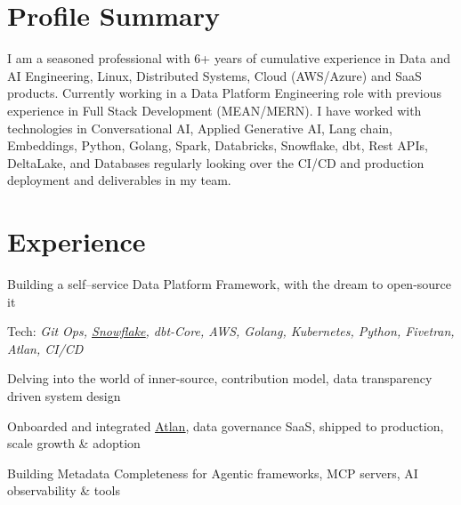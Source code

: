 \documentclass[]{deedy-resume-reversed}
\begin{document}
%
%
\lastupdated

%
%


\section{Profile Summary}
\justifying
I am a seasoned professional with 6+ years of cumulative experience in Data and AI Engineering, Linux, Distributed Systems, Cloud (AWS/Azure) and SaaS products. Currently working in a Data Platform Engineering role with previous experience in Full Stack Development (MEAN/MERN). I have worked with technologies in Conversational AI, Applied Generative AI, Lang chain, Embeddings, Python, Golang, Spark, Databricks, Snowflake, dbt, Rest APIs, DeltaLake, and Databases regularly looking over the CI/CD and production deployment and deliverables in my team.


\section{Experience}
\vspace{\topsep} %
\begin{tightemize}
\item Building a self–service Data Platform Framework, with the dream to open-source it
\item Tech: \textit{Git Ops, \href{https://www.snowflake.com/en/}{\underline{Snowflake}}, dbt-Core, AWS, Golang, Kubernetes, Python, Fivetran, Atlan, CI/CD}
\item Delving into the world of inner-source, contribution model, data transparency driven system design
\item Onboarded and integrated \href{https://atlan.com/demo/?ref=%2F&tour=data-discovery}{{\underline{Atlan}}}, data governance SaaS, shipped to production, scale growth \& adoption
\item Building Metadata Completeness for Agentic frameworks, MCP servers, AI observability \& tools
\end{tightemize}
\sectionsep
\end{document}
